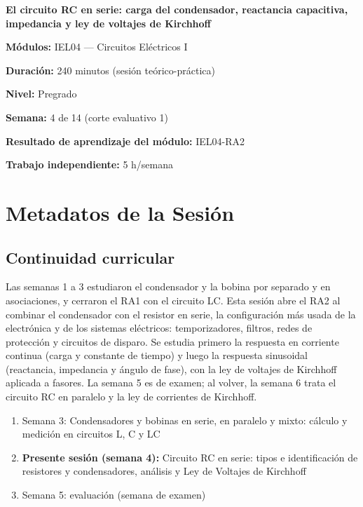\documentclass[11pt,letterpaper]{article}
\begin{document}
\begin{cabecera}
{\color{iubyellow}\Large\bfseries El circuito RC en serie: carga del condensador, reactancia capacitiva, impedancia y ley de voltajes de Kirchhoff\par}
\vspace{0.6em}
\small
\textbf{\color{iubyellow}Módulos:} IEL04 --- Circuitos Eléctricos I\par
\textbf{\color{iubyellow}Duración:} 240 minutos (sesión teórico-práctica)\par
\textbf{\color{iubyellow}Nivel:} Pregrado\par
\textbf{\color{iubyellow}Semana:} 4 de 14 (corte evaluativo 1)\par
\textbf{\color{iubyellow}Resultado de aprendizaje del módulo:} IEL04-RA2\par
\textbf{\color{iubyellow}Trabajo independiente:} 5 h/semana\par
\end{cabecera}

\section{Metadatos de la Sesión}

\subsection{Continuidad curricular}

Las semanas 1 a 3 estudiaron el condensador y la bobina por separado y en asociaciones, y cerraron el RA1 con el circuito LC. Esta sesión abre el RA2 al combinar el condensador con el resistor en serie, la configuración más usada de la electrónica y de los sistemas eléctricos: temporizadores, filtros, redes de protección y circuitos de disparo. Se estudia primero la respuesta en corriente continua (carga y constante de tiempo) y luego la respuesta sinusoidal (reactancia, impedancia y ángulo de fase), con la ley de voltajes de Kirchhoff aplicada a fasores. La semana 5 es de examen; al volver, la semana 6 trata el circuito RC en paralelo y la ley de corrientes de Kirchhoff.

\begin{enumerate}
  \item Semana 3: Condensadores y bobinas en serie, en paralelo y mixto: cálculo y medición en circuitos L, C y LC
  \item \textbf{Presente sesión (semana 4):} Circuito RC en serie: tipos e identificación de resistores y condensadores, análisis y Ley de Voltajes de Kirchhoff
  \item Semana 5: evaluación (semana de examen)
\end{enumerate}
\end{document}
